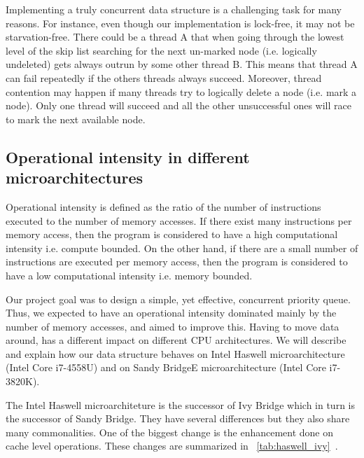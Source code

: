 Implementing a truly concurrent data structure is a challenging task for many reasons. For instance, even though our implementation is lock-free, it may not be starvation-free. There could be a thread A that when going through the lowest level of the skip list searching for the next un-marked node (i.e. logically undeleted) gets always outrun by some other thread B. This means that thread A can fail repeatedly if the others threads always succeed. Moreover, thread contention may happen if many threads try to logically delete a node (i.e. mark a node). Only one thread will succeed and all the other unsuccessful ones will race to mark
the next available node.\\

\subsection{Operational intensity in different microarchitectures}
Operational intensity is defined as the ratio of the number of instructions executed to the number of memory accesses. If there exist many instructions per memory access, then the program is considered to have a high computational intensity i.e. compute bounded. On the other hand, if there are a small number of instructions are executed per memory access, then the program is considered to have a low computational intensity i.e. memory bounded.

Our project goal was to design a simple, yet effective, concurrent priority queue. Thus, we expected to have an operational intensity dominated mainly by the number of memory accesses, and aimed to improve this. Having to move data around, has a different impact on different CPU architectures. We will describe and explain how our data structure behaves on Intel Haswell microarchitecture (Intel Core i7-4558U) and on Sandy BridgeE microarchitecture (Intel Core i7-3820K). 

The Intel Haswell microarchiteture is the successor of Ivy Bridge which in turn is the successor of Sandy Bridge. They have several differences but they also share many commonalities. One of the biggest change is the enhancement done on cache level operations. These changes are summarized in \tablename~\ref{tab:haswell_ivy}~\cite{ijcsit2013040321, microarchitecture, haswell_arch}.


